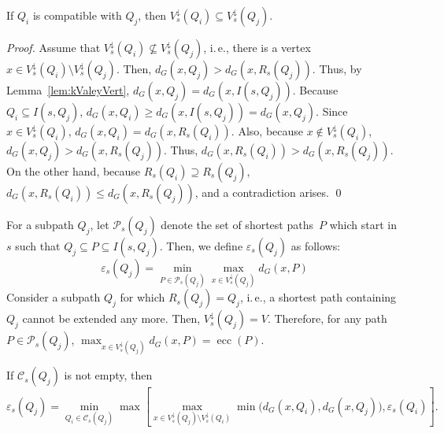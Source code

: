 \documentclass[10pt]{llncs}
\makeatletter
\newcommand{\calC}{\mathcal{C}}
\newcommand{\calP}{\mathcal{P}}
\newcommand{\ie}{i.\,e.\@ifnextchar{,}{}{~}}
\DeclareMathOperator{\ecc}{ecc}
\makeatother
\begin{document}
\begin{lemma}
    \label{lem:kValeyVertSubset}
If $Q_{i}$ is compatible with $Q_j$, then $V^\downarrow_s(Q_{i}) \subseteq V^\downarrow_s(Q_j)$.
\end{lemma}

\begin{proof}
Assume that $V^\downarrow_s(Q_{i}) \nsubseteq V^\downarrow_s(Q_j)$, \ie, there is a vertex~$x \in V^\downarrow_s(Q_{i}) \setminus V^\downarrow_s(Q_j)$.
Then, $d_G(x, Q_j) > d_G(x, R_s(Q_j))$.
Thus, by Lemma~\ref{lem:kValeyVert}, $d_G(x, Q_j) = d_G(x, I(s, Q_j))$.
Because $Q_{i} \subseteq I(s, Q_j)$, $d_G(x, Q_{i}) \geq d_G(x, I(s, Q_j)) = d_G(x, Q_j)$.
Since $x \in V^\downarrow_s(Q_{i})$, $d_G(x, Q_{i}) = d_G(x, R_s(Q_{i}))$.
Also, because $x \notin V^\downarrow_s(Q_{i})$, $d_G(x, Q_j) > d_G(x, R_s(Q_j))$.
Thus, $d_G(x, R_s(Q_{i})) > d_G(x, R_s(Q_j))$.
On the other hand, because $R_s(Q_{i}) \supseteq R_s(Q_j)$, $d_G(x, R_s(Q_{i})) \leq d_G(x, R_s(Q_j))$, and a contradiction arises.
\qed
\end{proof}

For a subpath $Q_j$, let $\calP_s(Q_j)$ denote the set of shortest paths~$P$ which start in~$s$ such that $Q_j \subseteq P \subseteq I(s, Q_j)$.
Then, we define $\varepsilon_s(Q_j)$ as follows:
\[
    \varepsilon_s(Q_j) = \min_{P \in \calP_s(Q_j)} \max_{x \in V^\downarrow_s(Q_j)} d_G(x, P)
\]
Consider a subpath $Q_j$ for which $R_s(Q_j) = Q_j$, \ie, a shortest path containing $Q_j$ cannot be extended any more.
Then, $V^\downarrow_s(Q_j) = V$.
Therefore, for any path $P \in \calP_s(Q_j)$, $\max_{x \in V^\downarrow_s(Q_j)} d_G(x, P) = \ecc(P)$.

\begin{lemma}
    \label{lem:valEpsilon}
If $\calC_s(Q_j)$ is not empty, then
\[
    \varepsilon_s(Q_j)
    =
    \min_{Q_{i} \in \calC_s(Q_j)} \max \left[
        \max_{x \in V^\downarrow_s(Q_j) \setminus V^\downarrow_s(Q_{i})} \min \big( d_G(x, Q_{i}), d_G(x, Q_{j}) \big),
        \varepsilon_s(Q_{i})
    \right].
\]
\end{lemma}
\end{document}
